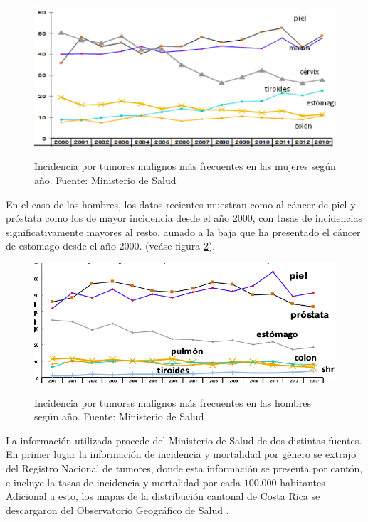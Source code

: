 \documentclass[12pt]{sciposter}
\begin{document}
\begin{multicols}{2}
\bigskip

\begin{figure}[h]
\begin{center}
\label{fig_inc_CCSS}
\includegraphics[width=\textwidth]{inc_CCSS1.png}
\caption{Incidencia por tumores malignos más frecuentes en las mujeres según año. Fuente: Ministerio de Salud \cite{Salud} }
\end{center}
\end{figure}

En el caso de los hombres, los datos recientes muestran como al cáncer de piel y próstata como los de mayor incidencia desde el año 2000, con tasas de incidencias significativamente mayores al resto, aunado a la baja que ha presentado el cáncer de estomago desde el año 2000. (veáse figura  \ref{fig_inc_CCSS2}).

\begin{figure}[h]
\begin{center}
\label{fig_inc_CCSS2}
\includegraphics[width=\textwidth]{inc_CCSS2.png}
\caption{Incidencia por tumores malignos más frecuentes en las hombres según año. Fuente: Ministerio de Salud \cite{Salud} }
\end{center}
\end{figure}

La información utilizada procede del Ministerio de Salud de dos distintas fuentes. En primer lugar la información de incidencia y mortalidad por género se extrajo del Registro Nacional de tumores, donde esta información se presenta por cantón, e incluye la tasas de incidencia y mortalidad por cada $100.000$ habitantes  \cite{Salud}. Adicional a esto, los mapas de la distribución cantonal de Costa Rica se descargaron del Observatorio Geográfico de Salud \cite{OGES}.



\end{multicols}
\end{document}
